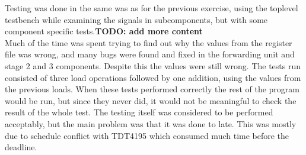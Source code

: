 Testing was done in the same was as for the previous exercise, using the toplevel testbench while examining the signals in subcomponents, but with some component specific tests.\textbf{TODO: add more content}\\
Much of the time was spent trying to find out why the values from the register file was wrong, and many bugs were found and fixed in the forwarding unit and stage 2 and 3 components. Despite this the values were still wrong. The tests run consisted of three load operations followed by one addition, using the values from the previous loads. When these tests performed correctly the rest of the program would be run, but since they never did, it would not be meaningful to check the result of the whole test. The testing itself was considered to be performed acceptably, but the main problem was that it was done to late. This was mostly due to schedule conflict with TDT4195 which consumed much time before the deadline.